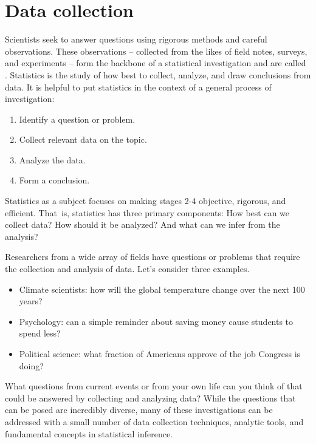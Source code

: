 \chapter{Data collection}
\label{introductionToData}


Scientists seek to answer questions using rigorous methods and careful observations. These observations -- collected from the likes of field notes, surveys, and experiments -- form the backbone of a statistical investigation and are called . Statistics is the study of how best to collect, analyze, and draw conclusions from data. It is helpful to put statistics in the context of a general process of investigation:
\begin{enumerate}
\setlength{\itemsep}{0mm}
\item Identify a question or problem.
\item Collect relevant data on the topic.
\item Analyze the data.
\item Form a conclusion.
\end{enumerate}

Statistics as a subject focuses on making stages 2-4 objective, rigorous, and efficient. That~is, statistics has three primary components: How best can we collect data? How should it be analyzed? And what can we infer from the analysis?

Researchers from a wide array of fields have questions or problems that require the collection and analysis of data. Let's consider three examples.
\begin{itemize}
\setlength{\itemsep}{0mm}
\item Climate scientists: how will the global temperature change over the next 100 years?
\item Psychology: can a simple reminder about saving money cause students to spend less?
\item Political science: what fraction of Americans approve of the job Congress is doing?
\end{itemize}
What questions from current events or from your own life can you think of that could be answered by collecting and analyzing data? While the questions that can be posed are incredibly diverse, many of these investigations can be addressed with a small number of data collection techniques, analytic tools, and fundamental concepts in statistical inference.

